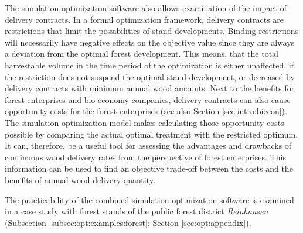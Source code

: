 The simulation-optimization software also allows examination of the impact of delivery contracts. In a formal optimization framework, delivery contracts are restrictions that limit the possibilities of stand developments. Binding restrictions will necessarily have negative effects on the objective value since they are always a deviation from the optimal forest development. This means, that the total harvestable volume in the time period of the optimization is either unaffected, if the restriction does not suspend the optimal stand development, or decreased by delivery contracts with minimum annual wood amounts. Next to the benefits for forest enterprises and bio-economy companies, delivery contracts can also cause opportunity costs for the forest enterprises (see also Section \ref{sec:intro:biecon}). The si\-mu\-la\-tion-op\-ti\-mi\-za\-tion model makes calculating those opportunity costs possible by comparing the actual optimal treatment with the restricted optimum. It can, therefore, be a useful tool for assessing the advantages and drawbacks of continuous wood delivery rates from the perspective of forest enterprises. This information can be used to find an objective trade-off between the costs and the benefits of annual wood delivery quantity.

The practicability of the combined si\-mu\-la\-tion-op\-ti\-mi\-za\-tion software is examined in a case study with forest stands of the public forest district \textit{Reinhausen} \citep{nlf_2017} (Subsection \ref{subsec:opt:examples:forest}; Section \ref{sec:opt:appendix}).